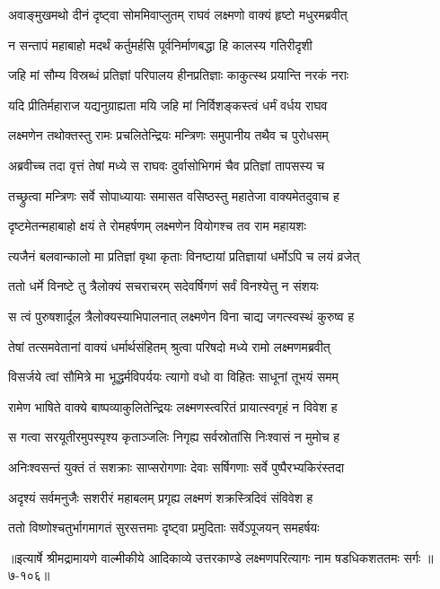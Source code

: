 
\twolineshloka
{अवाङ्मुखमथो दीनं दृष्ट्वा सोममिवाप्लुतम्}
{राघवं लक्ष्मणो वाक्यं हृष्टो मधुरमब्रवीत्} %

\twolineshloka
{न सन्तापं महाबाहो मदर्थं कर्तुमर्हसि}
{पूर्वनिर्माणबद्धा हि कालस्य गतिरीदृशी} %

\twolineshloka
{जहि मां सौम्य विस्रब्धं प्रतिज्ञां परिपालय}
{हीनप्रतिज्ञाः काकुत्स्थ प्रयान्ति नरकं नराः} %

\twolineshloka
{यदि प्रीतिर्महाराज यद्यनुग्राह्यता मयि}
{जहि मां निर्विशङ्कस्त्वं धर्मं वर्धय राघव} %

\twolineshloka
{लक्ष्मणेन तथोक्तस्तु रामः प्रचलितेन्द्रियः}
{मन्त्रिणः समुपानीय तथैव च पुरोधसम्} %

\twolineshloka
{अब्रवीच्च तदा वृत्तं तेषां मध्ये स राघवः}
{दुर्वासोभिगमं चैव प्रतिज्ञां तापसस्य च} %

\twolineshloka
{तच्छ्रुत्वा मन्त्रिणः सर्वे सोपाध्यायाः समासत}
{वसिष्ठस्तु महातेजा वाक्यमेतदुवाच ह} %

\twolineshloka
{दृष्टमेतन्महाबाहो क्षयं ते रोमहर्षणम्}
{लक्ष्मणेन वियोगश्च तव राम महायशः} %

\twolineshloka
{त्यजैनं बलवान्कालो मा प्रतिज्ञां वृथा कृताः}
{विनष्टायां प्रतिज्ञायां धर्मोऽपि च लयं व्रजेत्} %

\twolineshloka
{ततो धर्मे विनष्टे तु त्रैलोक्यं सचराचरम्}
{सदेवर्षिगणं सर्वं विनश्येत्तु न संशयः} %

\twolineshloka
{स त्वं पुरुषशार्दूल त्रैलोक्यस्याभिपालनात्}
{लक्ष्मणेन विना चाद्य जगत्स्वस्थं कुरुष्व ह} %

\twolineshloka
{तेषां तत्समवेतानां वाक्यं धर्मार्थसंहितम्}
{श्रुत्वा परिषदो मध्ये रामो लक्ष्मणमब्रवीत्} %

\twolineshloka
{विसर्जये त्वां सौमित्रे मा भूद्धर्मविपर्ययः}
{त्यागो वधो वा विहितः साधूनां तूभयं समम्} %

\twolineshloka
{रामेण भाषिते वाक्ये बाष्पव्याकुलितेन्द्रियः}
{लक्ष्मणस्त्वरितं प्रायात्स्वगृहं न विवेश ह} %

\twolineshloka
{स गत्वा सरयूतीरमुपस्पृश्य कृताञ्जलिः}
{निगृह्य सर्वस्रोतांसि निःश्वासं न मुमोच ह} %

\twolineshloka
{अनिःश्वसन्तं युक्तं तं सशक्राः साप्सरोगणाः}
{देवाः सर्षिगणाः सर्वे पुष्पैरभ्यकिरंस्तदा} %

\twolineshloka
{अदृश्यं सर्वमनुजैः सशरीरं महाबलम्}
{प्रगृह्य लक्ष्मणं शक्रस्त्रिदिवं संविवेश ह} %

\twolineshloka
{ततो विष्णोश्चतुर्भागमागतं सुरसत्तमाः}
{दृष्ट्वा प्रमुदिताः सर्वेऽपूजयन् समहर्षयः} %


॥इत्यार्षे श्रीमद्रामायणे वाल्मीकीये आदिकाव्ये उत्तरकाण्डे लक्ष्मणपरित्यागः नाम षडधिकशततमः सर्गः ॥७-१०६॥

